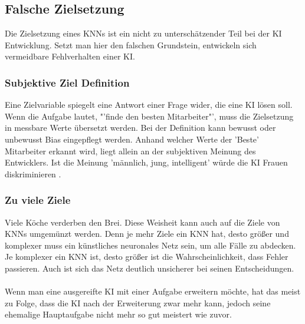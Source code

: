 \documentclass[12pt,oneside,a4paper,parskip]{scrbook}
\begin{document}
\subsection{Falsche Zielsetzung}
Die Zielsetzung eines KNNs ist ein nicht zu unterschätzender Teil bei der KI Entwicklung. Setzt man hier den falschen Grundstein, entwickeln sich vermeidbare Fehlverhalten einer KI.
\subsubsection{Subjektive Ziel Definition}
Eine Zielvariable spiegelt eine Antwort einer Frage wider, die eine KI lösen soll. Wenn die Aufgabe lautet, "'finde den besten Mitarbeiter"', muss die Zielsetzung in messbare Werte übersetzt werden. Bei der Definition kann bewusst oder unbewusst Bias eingepflegt werden. Anhand welcher Werte der 'Beste' Mitarbeiter erkannt wird, liegt allein an der subjektiven Meinung des Entwicklers. Ist die Meinung 'männlich, jung, intelligent' würde die KI Frauen diskriminieren \cite{KIPediaBias}.

\subsubsection{Zu viele Ziele}
Viele Köche verderben den Brei. Diese Weisheit kann auch auf die Ziele von KNNs umgemünzt werden. Denn je mehr Ziele ein KNN hat, desto größer und komplexer muss ein künstliches neuronales Netz sein, um alle Fälle zu abdecken. Je komplexer ein KNN ist, desto größer ist die Wahrscheinlichkeit, dass Fehler passieren. Auch ist sich das Netz deutlich unsicherer bei seinen Entscheidungen.
\\\\ %
Wenn man eine ausgereifte KI mit einer Aufgabe erweitern möchte, hat das meist zu Folge, dass die KI nach der Erweiterung zwar mehr kann, jedoch seine ehemalige Hauptaufgabe nicht mehr so gut meistert wie zuvor.
\end{document}
